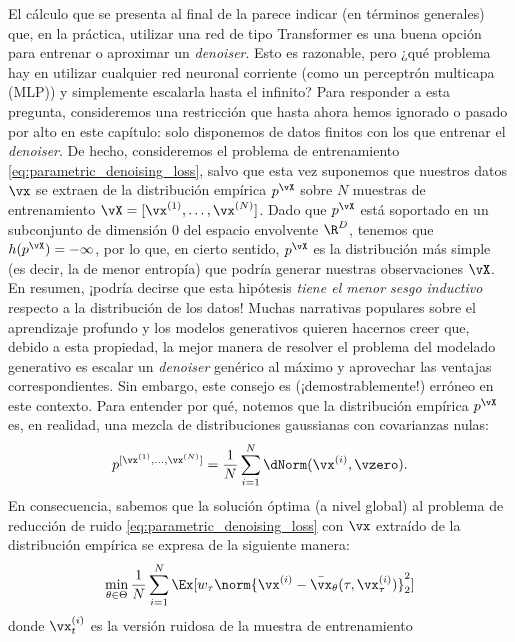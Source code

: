 \documentclass[../../book-main.tex]{subfiles}
\begin{document}
El cálculo que se presenta al final de la
 parece indicar (en términos generales)
que, en la práctica, utilizar una red de tipo Transformer es una
buena opción para entrenar o aproximar un \textit{denoiser}. Esto es
razonable, pero ¿qué problema hay en utilizar cualquier red neuronal corriente
(como un perceptrón multicapa (MLP)) y simplemente escalarla
hasta el infinito? Para responder a esta pregunta, consideremos una restricción
que hasta ahora hemos ignorado o pasado por alto en este capítulo: solo
disponemos de datos finitos con los que entrenar el \textit{denoiser}. De hecho, consideremos
el problema de entrenamiento \eqref{eq:parametric_denoising_loss},
salvo que esta vez suponemos que nuestros datos \(\vx\) se extraen de la
distribución empírica \(p^{\vX}\) sobre \(N\) muestras de entrenamiento
\(\vX = [\vx^{(1)}, \dots, \vx^{(N)}]\). Dado que \(p^{\vX}\) está soportado
en un subconjunto de dimensión \(0\) del espacio envolvente \(\R^{D}\),
tenemos que \(h(p^{\vX}) = -\infty\), por lo que, en cierto sentido, \(p^{\vX}\) es
la distribución más simple (es decir, la de menor entropía) que podría generar
nuestras observaciones \(\vX\). En resumen, ¡podría decirse que esta hipótesis \textit{tiene el
menor sesgo inductivo} respecto a la distribución de los datos! Muchas
narrativas populares sobre el aprendizaje profundo y los modelos generativos
quieren hacernos creer que, debido a esta propiedad, la mejor manera de resolver
el problema del modelado generativo es escalar un \textit{denoiser} genérico
al máximo y aprovechar las ventajas correspondientes. Sin embargo, este consejo es (¡demostrablemente!) erróneo en este contexto.
Para entender por qué, notemos que la distribución empírica
\(p^{\vX}\) es, en realidad, una mezcla de distribuciones gaussianas con covarianzas nulas:
\begin{equation}
    p^{[\vx^{(1)}, \dots, \vx^{(N)}]} = \frac{1}{N}\sum_{i =
    1}^{N}\dNorm(\vx^{(i)}, \vzero).
\end{equation}
En consecuencia, sabemos que la solución óptima (a nivel global) al
problema de reducción de ruido \eqref{eq:parametric_denoising_loss} con \(\vx\)
extraído de la distribución empírica se expresa de la siguiente manera:
\begin{equation}\label{eq:parametric_denoising_loss_finite_sample}
    \min_{\theta \in \Theta}\frac{1}{N}\sum_{i =
    1}^{N}\Ex[w_{\tau}\norm{\vx^{(i)} - \bar{\vx}_{\theta}(\tau,
    \vx_{\tau}^{(i)})}_{2}^{2}]
\end{equation}
donde \(\vx_{t}^{(i)}\) es la versión ruidosa de la muestra de entrenamiento
\end{document}
